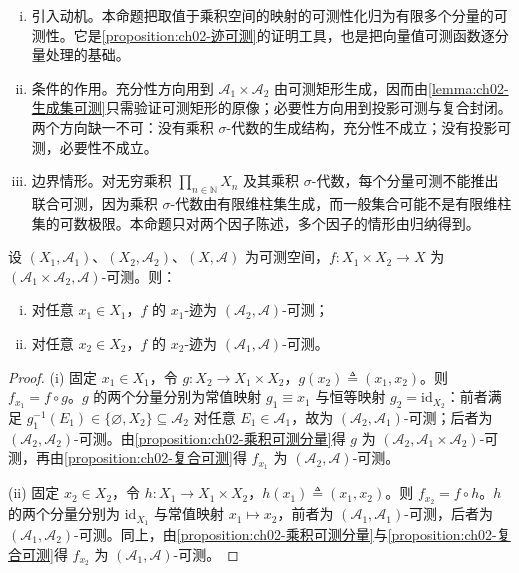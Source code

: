 \documentclass[../../main.tex]{subfiles}%
\begin{document}
\begin{remark}\label{remark:ch02-分量可测}
\begin{enumerate}[(i)]
\item 引入动机。本命题把取值于乘积空间的映射的可测性化归为有限多个分量的可测性。它是\cref{proposition:ch02-迹可测}的证明工具，也是把向量值可测函数逐分量处理的基础。
\item 条件的作用。充分性方向用到 $\mathscr A_1\times\mathscr A_2$ 由可测矩形生成，因而由\cref{lemma:ch02-生成集可测}只需验证可测矩形的原像；必要性方向用到投影可测与复合封闭。两个方向缺一不可：没有乘积 $\sigma$-代数的生成结构，充分性不成立；没有投影可测，必要性不成立。
\item 边界情形。对无穷乘积 $\prod_{n\in\mathbb{N}}X_n$ 及其乘积 $\sigma$-代数，每个分量可测不能推出联合可测，因为乘积 $\sigma$-代数由有限维柱集生成，而一般集合可能不是有限维柱集的可数极限。本命题只对两个因子陈述，多个因子的情形由归纳得到。
\end{enumerate}
\end{remark}

\begin{proposition}\label{proposition:ch02-迹可测}
设 $(X_1,\mathscr A_1)$、$(X_2,\mathscr A_2)$、$(X,\mathscr A)$ 为可测空间，$f:X_1\times X_2\to X$ 为 $(\mathscr A_1\times\mathscr A_2,\mathscr A)$-可测。则：
\begin{enumerate}[(i)]
\item 对任意 $x_1\in X_1$，$f$ 的 $x_1$-迹为 $(\mathscr A_2,\mathscr A)$-可测；
\item 对任意 $x_2\in X_2$，$f$ 的 $x_2$-迹为 $(\mathscr A_1,\mathscr A)$-可测。
\end{enumerate}
\end{proposition}

\begin{proof}
(i) 固定 $x_1\in X_1$，令 $g:X_2\to X_1\times X_2$，$g(x_2)\triangleq(x_1,x_2)$。则 $f_{x_1}=f\circ g$。$g$ 的两个分量分别为常值映射 $g_1\equiv x_1$ 与恒等映射 $g_2=\mathrm{id}_{X_2}$：前者满足 $g_1^{-1}(E_1)\in\{\varnothing,X_2\}\subseteq\mathscr A_2$ 对任意 $E_1\in\mathscr A_1$，故为 $(\mathscr A_2,\mathscr A_1)$-可测；后者为 $(\mathscr A_2,\mathscr A_2)$-可测。由\cref{proposition:ch02-乘积可测分量}得 $g$ 为 $(\mathscr A_2,\mathscr A_1\times\mathscr A_2)$-可测，再由\cref{proposition:ch02-复合可测}得 $f_{x_1}$ 为 $(\mathscr A_2,\mathscr A)$-可测。

(ii) 固定 $x_2\in X_2$，令 $h:X_1\to X_1\times X_2$，$h(x_1)\triangleq(x_1,x_2)$。则 $f_{x_2}=f\circ h$。$h$ 的两个分量分别为 $\mathrm{id}_{X_1}$ 与常值映射 $x_1\mapsto x_2$，前者为 $(\mathscr A_1,\mathscr A_1)$-可测，后者为 $(\mathscr A_1,\mathscr A_2)$-可测。同上，由\cref{proposition:ch02-乘积可测分量}与\cref{proposition:ch02-复合可测}得 $f_{x_2}$ 为 $(\mathscr A_1,\mathscr A)$-可测。
\end{proof}
\end{document}
